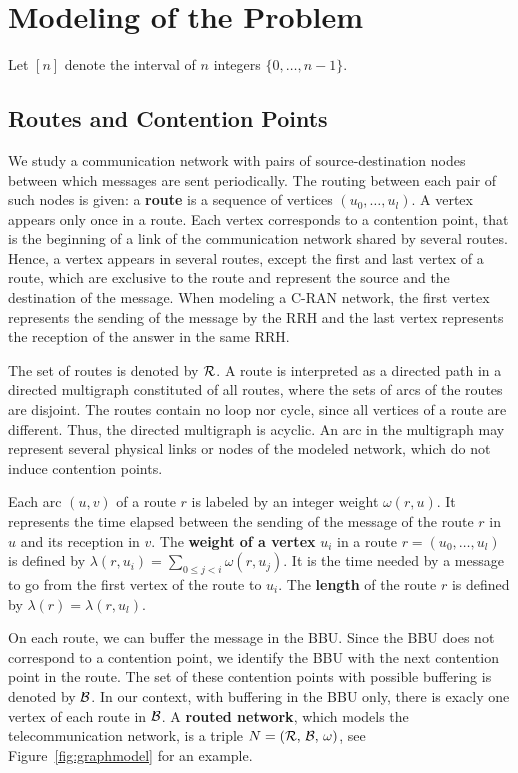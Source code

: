 \documentclass[a4paper,10pt]{article}
\begin{document}
\section{Modeling of the Problem}\label{sec:def}

Let $[n]$ denote the interval of $n$ integers $\{0,\dots,n-1\}$.


	\subsection{Routes and Contention Points}

  	We study a communication network with pairs of source-destination nodes between which messages are sent periodically. The routing between each pair of such nodes is given: a \textbf{route} is a sequence of vertices $(u_0, \ldots , u_{l})$. A vertex appears only once in a route. Each vertex corresponds to a contention point, that is the beginning of a link of the communication network shared by several routes. Hence, a vertex appears in several routes, except the first and last vertex of a route, which are exclusive to the route and represent the source and the destination of the message. When modeling a C-RAN network, the first vertex represents the sending of the message by the RRH and the last vertex represents the reception of the answer in the same RRH. 

  	The set of routes is denoted by ${\cal R}$. A route is interpreted as a directed path in a directed multigraph constituted of all routes, where the sets of arcs of the routes are disjoint. The routes contain no loop nor cycle, since all vertices of a route are different. Thus, the directed multigraph is acyclic. An arc in the multigraph may represent several physical links or nodes of the modeled network, which do not induce contention points. 


  	Each arc $(u,v)$ of a route $r$ is labeled by an integer weight $\omega(r,u)$. It represents the time elapsed between the sending of the message of the route $r$ in $u$ and its reception in $v$.
    The {\bf weight of a vertex} $u_i$ in a route $r=(u_0,\dots,u_l)$ is defined by $\lambda(r,u_i)= \sum\limits_{0 \leq j <i} \omega(r,u_j)$. It is the time needed by a message to go from the first vertex of the route to $u_i$. The \textbf{length} of the route $r$ is defined by $\lambda(r)= \lambda(r,u_l)$. 

  	On each route, we can buffer the message in the BBU. Since the BBU does not correspond to a contention point, we identify the BBU with the next contention point in the route. The set of these contention points with possible buffering is denoted by ${\cal B}$. In our context, with buffering in the BBU only, there is exacly one vertex of each route in $\cal{B}$.
  	A \textbf{routed network}, which models the telecommunication network, is a triple $N = (\cal{R},\,\cal{B},\,\omega)$, see Figure~\ref{fig:graphmodel} for an example. 
\end{document}
